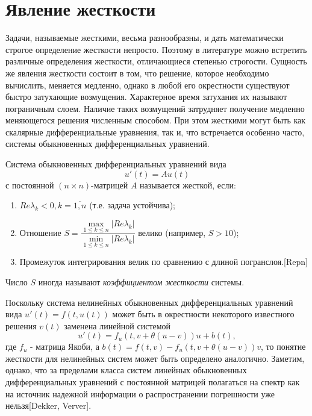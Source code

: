 \documentclass[a4paper,14pt]{extreport}
\begin{document}
  \section{Явление жесткости}
  \label{s:stiffness}
  Задачи, называемые жесткими, весьма разнообразны, и дать математически строгое определение жесткости непросто. Поэтому в литературе можно встретить различные определения жесткости, отличающиеся степенью строгости. Сущность же явления жесткости состоит в том, что решение, которое необходимо вычислить, меняется медленно, однако в любой его окрестности существуют быстро затухающие возмущения. Характерное время затухания их называют пограничным слоем. Наличие таких возмущений затрудняет получение медленно меняющегося решения численным способом. При этом жесткими могут быть как скалярные дифференциальные уравнения, так и, что встречается особенно часто, системы обыкновенных дифференциальных уравнений.
  
  
\begin{Definition}Система обыкновенных дифференциальных уравнений вида
  \begin{equation}
  \label{stiff:eq}
    u'(t)=Au(t)
  \end{equation}
  с постоянной $(n \times n)$-матрицей $ A $ называется жесткой, если: 
  \begin{enumerate}
  \item $Re\lambda _k <0, k=\overbar{1,n}$ (т.е. задача устойчива);
  \item Отношение $S = \dfrac{\max\limits_{1\leq k\leq n} |Re\lambda _k|}{\min\limits_{1\leq k\leq n} |Re\lambda _k|} $ велико (например, $S > 10$);
  \item Промежуток интегрирования велик по сравнению с длиной погранслоя.[Repn]
  \end{enumerate}
\end{Definition}

Число $S$ иногда называют \textit{коэффициентом жесткости} системы. 


Поскольку система нелинейных обыкновенных дифференциальных уравнений вида $u'(t)=f(t, u(t))$ может быть в окрестности некоторого известного решения $v(t)$ заменена линейной системой 
$$u'(t) = f_u (t, v + \theta (u-v))u + b(t), $$
где $f_u$ - матрица Якоби, а $b(t) = f(t, v)-f_u(t,v + \theta (u-v))v$, то понятие жесткости для нелинейных систем может быть определено аналогично. Заметим, однако, что за пределами класса систем линейных обыкновенных дифференциальных уравнений с постоянной матрицей полагаться на спектр как на источник надежной информации о распространении погрешности уже нельзя[Dekker, Verver].
\end{document}
